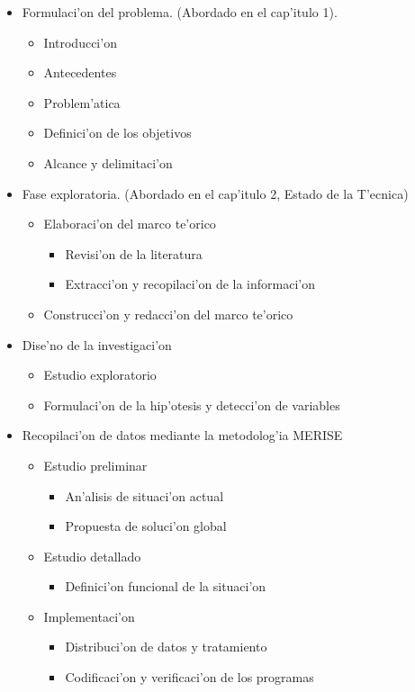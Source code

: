 \begin{itemize}
\item Formulaci'on del problema. (Abordado en el cap'itulo 1).
\begin{itemize}
\item Introducci'on
\item Antecedentes
\item Problem'atica
\item Definici'on de los objetivos
\item Alcance y delimitaci'on
\end{itemize}
\item Fase exploratoria. (Abordado en el cap'itulo 2, Estado de la T'ecnica)
\begin{itemize}
\item Elaboraci'on del marco te'orico
\begin{itemize}
\item Revisi'on de la literatura
\item Extracci'on y recopilaci'on de la informaci'on
\end{itemize}
\item Construcci'on y redacci'on del marco te'orico
\end{itemize}
\item Dise'no de la investigaci'on
\begin{itemize}
\item Estudio exploratorio
\item Formulaci'on de la hip'otesis y detecci'on de variables
\end{itemize}
\item Recopilaci'on de datos mediante la metodolog'ia MERISE
\begin{itemize}
\item Estudio preliminar
\begin{itemize}
\item An'alisis de situaci'on actual
\item Propuesta de soluci'on global
\end{itemize}
\item Estudio detallado
\begin{itemize}
\item Definici'on funcional de la situaci'on
\end{itemize}
\item Implementaci'on
\begin{itemize}
\item Distribuci'on de datos y tratamiento
\item Codificaci'on y verificaci'on de los programas

\end{itemize}
\end{itemize}
\end{itemize}
